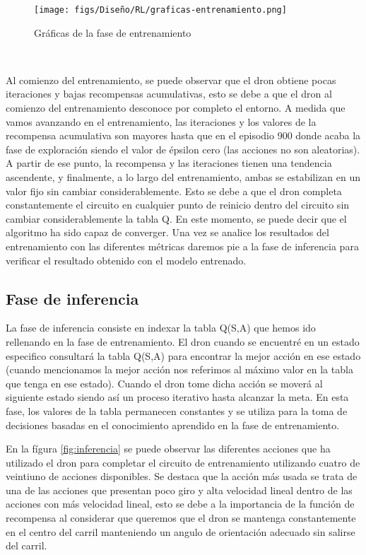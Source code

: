 \begin{figure} [H]
  \begin{center}
    \texttt{[image: figs/Diseño/RL/graficas-entrenamiento.png]}
  \end{center}
  \caption{Gráficas de la fase de entrenamiento}
  \label{fig:entrenamiento}
\end{figure}\

Al comienzo del entrenamiento, se puede observar que el dron obtiene pocas iteraciones y bajas recompensas acumulativas, 
esto se debe a que el dron al comienzo del entrenamiento desconoce por completo el entorno. A medida que vamos avanzando en el entrenamiento, 
las iteraciones y los valores de la recompensa acumulativa son mayores hasta que en el episodio 900 donde acaba la fase de exploración 
siendo el valor de épsilon cero (las acciones no son aleatorias). A partir de ese punto, la recompensa y las iteraciones tienen una tendencia ascendente, y finalmente, 
a lo largo del entrenamiento, ambas se estabilizan en un valor fijo sin cambiar considerablemente. Esto se debe a que el dron completa constantemente el circuito en cualquier
punto de reinicio dentro del circuito sin cambiar considerablemente la tabla Q. En este momento, se puede decir que el algoritmo ha sido capaz de converger. Una vez se analice 
los resultados del entrenamiento con las diferentes métricas daremos pie a la fase de inferencia para verificar el resultado obtenido con el modelo entrenado. 

\subsection{Fase de inferencia}
\label{sec:fases_inferencia}
La fase de inferencia consiste en indexar la tabla Q(S,A) que hemos ido rellenando en la fase de entrenamiento. El dron cuando se encuentré en un estado especifico consultará la tabla Q(S,A) para
encontrar la mejor acción en ese estado (cuando mencionamos la mejor acción nos referimos al máximo valor en la tabla que tenga en ese estado). Cuando el dron tome dicha acción se moverá al siguiente estado
siendo así un proceso iterativo hasta alcanzar la meta. En esta fase, los valores de la tabla permanecen constantes y se utiliza para la toma de decisiones basadas en el conocimiento
aprendido en la fase de entrenamiento. \newline

En la fígura \ref{fig:inferencia} se puede observar las diferentes acciones que ha utilizado el dron para completar el circuito de entrenamiento utilizando cuatro de veintiuno de acciones
disponibles. Se destaca que la acción más usada se trata de una de las acciones que presentan poco giro y alta velocidad lineal dentro de las acciones con más velocidad lineal, esto se debe
a la importancia de la función de recompensa al considerar que queremos que el dron se mantenga constantemente en el centro del carril manteniendo un angulo de orientación adecuado
sin salirse del carril.

